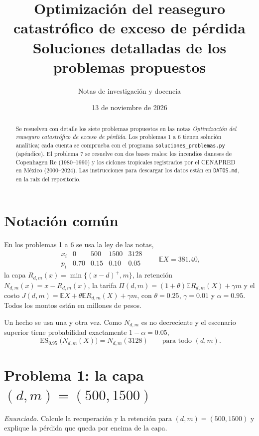 \documentclass[11pt,reqno]{amsart}
\title[Soluciones de los problemas propuestos]{Optimización del reaseguro catastrófico de exceso de pérdida\\\large Soluciones detalladas de los problemas propuestos}
\author{Notas de investigación y docencia}
\date{13 de noviembre de 2026}
\theoremstyle{definition}\newtheorem{definition}[theorem]{Definición}
\theoremstyle{remark}\newtheorem{remark}[theorem]{Observación}
\DeclareMathOperator{\ES}{ES}
\newcommand{\E}{\mathbb E}
\newcommand{\pos}[1]{(#1)^+}
\begin{document}
\begin{abstract}
Se resuelven con detalle los siete problemas propuestos en las notas \emph{Optimización del reaseguro catastrófico de exceso de pérdida}. Los problemas 1 a 6 tienen solución analítica; cada cuenta se comprueba con el programa \texttt{soluciones\_problemas.py} (apéndice). El problema 7 se resuelve con dos bases reales: los incendios daneses de Copenhagen Re (1980--1990) y los ciclones tropicales registrados por el CENAPRED en México (2000--2024). Las instrucciones para descargar los datos están en \texttt{DATOS.md}, en la raíz del repositorio.
\end{abstract}
\maketitle
\tableofcontents

\section*{Notación común}
En los problemas 1 a 6 se usa la ley de las notas,
\begin{equation}\label{eq:law}
\begin{array}{c|rrrr}
x_i&0&500&1500&3128\\\hline
p_i&0.70&0.15&0.10&0.05
\end{array}
\qquad \E X=381.40,
\end{equation}
la capa $R_{d,m}(x)=\min\{\pos{x-d},m\}$, la retención $N_{d,m}(x)=x-R_{d,m}(x)$, la tarifa $\Pi(d,m)=(1+\theta)\E R_{d,m}(X)+\gamma m$ y el costo $J(d,m)=\E X+\theta\E R_{d,m}(X)+\gamma m$, con $\theta=0.25$, $\gamma=0.01$ y $\alpha=0.95$. Todos los montos están en millones de pesos.

Un hecho se usa una y otra vez. Como $N_{d,m}$ es no decreciente y el escenario superior tiene probabilidad exactamente $1-\alpha=0.05$,
\begin{equation}\label{eq:esmax}
\ES_{0.95}\bigl(N_{d,m}(X)\bigr)=N_{d,m}(3128)\qquad\text{para todo }(d,m).
\end{equation}

\section{Problema 1: la capa $(d,m)=(500,1500)$}
\emph{Enunciado.} Calcule la recuperación y la retención para $(d,m)=(500,1500)$ y explique la pérdida que queda por encima de la capa.
\end{document}
